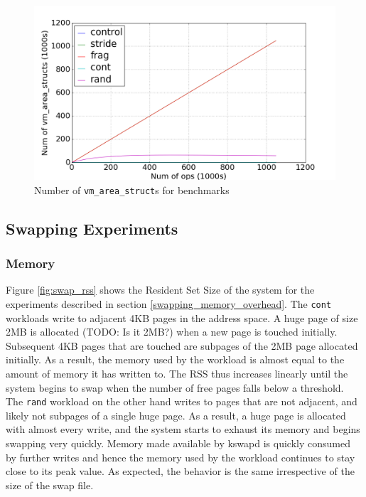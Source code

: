 \documentclass[twocolumn,11pt]{article}
\begin{document}
\begin{figure}
    \includegraphics[width=\columnwidth]{figures/vm_area_struct_count}
    \caption{Number of \texttt{vm\_area\_struct}s for benchmarks}
    \label{fig:vm_area_struct_count}
\end{figure}


\subsection{Swapping Experiments}

\subsubsection{Memory}
Figure \ref{fig:swap_rss} shows the Resident Set Size of the system for the
experiments described in section \ref{swapping_memory_overhead}. The
\texttt{cont} workloads write to  adjacent 4KB pages in the address space. A
huge page of size 2MB is allocated (TODO: Is it 2MB?) when a new page is touched
initially. Subsequent 4KB pages that are touched are subpages of the 2MB page
allocated initially. As a result, the memory used by the workload is almost
equal to the amount of memory it has written to. The RSS thus increases linearly
until the system begins to swap when the number of free pages falls below a
threshold. The \texttt{rand} workload on the other hand writes to pages that are
not adjacent, and likely not subpages of a single huge page. As a result, a huge
page is allocated with almost every write, and the system starts to exhaust its
memory and begins swapping very quickly. Memory made available by kswapd is
quickly consumed by further writes and hence the memory used by the workload
continues to stay close to its peak value. As expected, the behavior is the same
irrespective of the size of the swap file.
\end{document}
